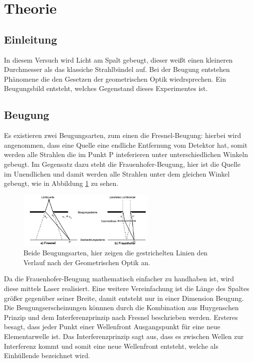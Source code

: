 \section{Theorie}
\label{sec:Theorie}

\subsection{Einleitung}
In diesem Versuch wird Licht am Spalt gebeugt, dieser weißt einen kleineren Durchmesser als das klassiche
Strahlbündel auf. Bei der Beugung entstehen Phänomene die den Gesetzen der geometrischen Optik wiedrsprechen.
Ein Beugungsbild entsteht, welches Gegenstand dieses Experimentes ist.

\subsection{Beugung}
Es existieren zwei Beugungsarten, zum einen die Fresnel-Beugung: hierbei wird angenommen, dass eine
Quelle eine endliche Entfernung vom Detektor hat, somit werden alle Strahlen die im Punkt P inteferieren
unter unterschiedlichen Winkeln gebeugt. Im Gegensatz dazu steht die Frauenhofer-Beugung, hier ist
die Quelle im Unendlichen und damit werden alle Strahlen unter dem gleichen Winkel gebeugt, wie in Abbildung
\ref{fig:BA} zu sehen.
 \begin{figure}
  \centering
  \includegraphics[width=0.6\textwidth]{BA.PNG}
  \caption{Beide Beugungsarten, hier zeigen die gestrichelten Linien den Verlauf nach der Geometrischen Optik an.\cite{sample}}
  \label{fig:BA}
\end{figure}
Da die Frauenhofer-Beugung mathematisch einfacher zu handhaben ist, wird diese mittels Laser realisiert.
Eine weitere Vereinfachung ist die Länge des Spaltes größer gegenüber seiner Breite, damit entsteht nur
in einer Dimension Beugung.
Die Beugungserscheinungen könnnen durch die Kombination aus Huygenschen Prinzip und dem Interferenzprinzip nach Fresnel beschrieben werden.
Ersteres besagt, dass jeder Punkt einer Wellenfront Ausgangspunkt für eine neue Elementarwelle ist.
Das Interferenzprinzip sagt aus, dass es zwischen Wellen zur Interferenz kommt und somit eine neue Wellenfront
entsteht, welche als Einhüllende bezeichnet wird.
